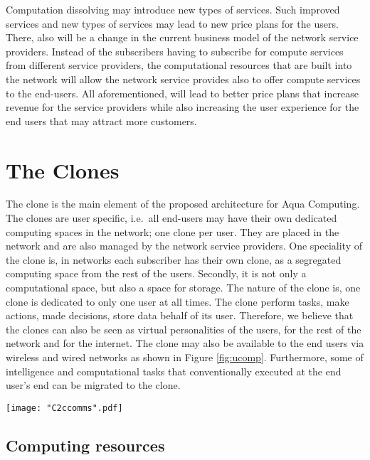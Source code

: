 \documentclass[12pt,journal,compsoc, onecolumn]{IEEEtran}
\begin{document}
Computation dissolving may introduce new types of services. Such improved services and new types of services may lead to new price plans for the users. There, also will be a change in the current business model of the network service providers. Instead of the subscribers having to subscribe for compute services from different service providers, the computational resources that are built into the network will allow the network service provides also to offer compute services to the end-users. All aforementioned, will lead to better price plans that increase revenue for the service providers while also increasing the user experience for the end users that may attract more customers.

\section{The Clones}
\label{sec:theclones}

The clone is the main element of the proposed architecture for Aqua Computing. The clones are user specific, i.e.\ all end-users may have their own dedicated computing spaces in the network; one clone per user. They are placed in the network and are also managed by the network service providers. One speciality of the clone is, in networks each subscriber has their own clone, as a segregated computing space from the rest of the users. Secondly, it is not only a computational space, but also a space for storage. The nature of the clone is, one clone is dedicated to only one user at all times. The clone perform tasks, make actions, made decisions, store data behalf of its user. Therefore, we believe that the clones can also be seen as virtual personalities of the users, for the rest of the network and for the internet. The clone may also be available to the end users via wireless and wired networks as shown in Figure \ref{fig:ucomp}. Furthermore, some of intelligence and computational tasks that conventionally executed at the end user's end can be migrated to the clone. 

\begin{figure*}[ht]
\centering
\texttt{[image: "C2ccomms".pdf]}
\caption{\label{fig:ucomp} Clone: an architecture for Aqua Computing}
\end{figure*} 

\subsection{Computing resources}
\end{document}
